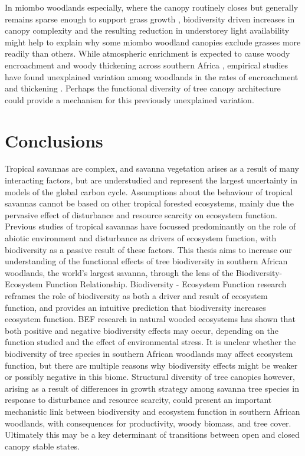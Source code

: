 \begin{refsection}
In miombo woodlands especially, where the canopy routinely closes but generally remains sparse enough to support grass growth \citep{Frost1996}, biodiversity driven increases in canopy complexity and the resulting reduction in understorey light availability might help to explain why some miombo woodland canopies exclude grasses more readily than others. While atmospheric \co{} enrichment is expected to cause woody encroachment and woody thickening across southern Africa \citep{Stevens2016b}, empirical studies have found unexplained variation among woodlands in the rates of encroachment and thickening \citep{Lewis2009}. Perhaps the functional diversity of tree canopy architecture could provide a mechanism for this previously unexplained variation. 

\section{Conclusions}
\label{background:sec:conclusion}

Tropical savannas are complex, and savanna vegetation arises as a result of many interacting factors, but are understudied and represent the largest uncertainty in models of the global carbon cycle. Assumptions about the behaviour of tropical savannas cannot be based on other tropical forested ecosystems, mainly due the pervasive effect of disturbance and resource scarcity on ecosystem function. Previous studies of tropical savannas have focussed predominantly on the role of abiotic environment and disturbance as drivers of ecosystem function, with biodiversity as a passive result of these factors. This thesis aims to increase our understanding of the functional effects of tree biodiversity in southern African woodlands, the world's largest savanna, through the lens of the Biodiversity-Ecosystem Function Relationship. Biodiversity - Ecosystem Function research reframes the role of biodiversity as both a driver and result of ecosystem function, and provides an intuitive prediction that biodiversity increases ecosystem function. BEF research in natural wooded ecosystems has shown that both positive and negative biodiversity effects may occur, depending on the function studied and the effect of environmental stress. It is unclear whether the biodiversity of tree species in southern African woodlands may affect ecosystem function, but there are multiple reasons why biodiversity effects might be weaker or possibly negative in this biome. Structural diversity of tree canopies however, arising as a result of differences in growth strategy among savanna tree species in response to disturbance and resource scarcity, could present an important mechanistic link between biodiversity and ecosystem function in southern African woodlands, with consequences for productivity, woody biomass, and tree cover. Ultimately this may be a key determinant of transitions between open and closed canopy stable states. 

\newpage{}
\FloatBarrier{}
\begingroup
{}
\printbibliography[heading=subbibintoc]
\endgroup

\end{refsection}


